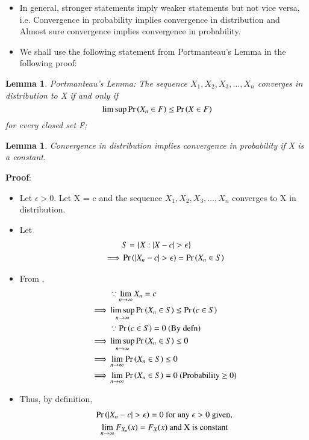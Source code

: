 \documentclass[journal,12pt,twocolumn]{IEEEtran}
\newtheorem{lemma}[theorem]{Lemma}
\begin{document}
\begin{itemize}
    \item In general, stronger statements imply weaker statements but not vice versa, i.e. Convergence in probability implies convergence in distribution and Almost sure convergence implies convergence in probability.
    \item We shall use the following statement from Portmanteau's Lemma in the following proof:
    \end{itemize}
    \begin{lemma}{Portmanteau's Lemma}:\newline
             The sequence $X_1,X_2,X_3, \dots ,X_n$ converges in distribution to X if and only if \begin{equation}
                  \limsup \Pr\left(X_{n}\in F\right) \leq \Pr\left(X \in F\right)
             \end{equation} for every closed set F;
        \end{lemma}

\begin{lemma} Convergence in distribution implies convergence in probability if X is a constant.\end{lemma}
    \textbf{Proof}:
    \begin{itemize}
        \item Let $\epsilon > 0$. Let X = c and the sequence $X_1,X_2,X_3, \dots ,X_n$ converges to X in distribution.
        \item Let \begin{align}
            &S = \{X : |X - c| > \epsilon\} \\
            \implies &\pr{|X_n - c|>\epsilon} = \pr{X_ n\in S}
        \end{align}
        \item From , 
        \begin{align}
           &\because \lim_{n \rightarrow \infty}X_n = c \\
            \implies &\limsup_{n \rightarrow \infty} \Pr\left(X_n \in S\right) \leq  \Pr\left(c \in S\right) \\
            &\because \Pr\left(c \in S\right) = 0 \text{ (By defn)} \\
            \implies &\limsup_{n \rightarrow \infty} \Pr\left(X_n \in S\right) \leq 0 \\
            \implies &\lim_{n \rightarrow \infty} \Pr\left(X_n \in S\right) \leq 0\\
            \implies &\lim_{n \rightarrow \infty} \Pr\left(X_n \in S\right) = 0 \text{ (Probability $\geq 0$)}
        \end{align}
        
        \item Thus, by definition,
        \begin{multline}
             \pr{|X_n-c|> \epsilon} = 0 \text{ for any }\epsilon > 0 \text{ given,} \\    
            \lim_{n \rightarrow \infty} F_{X_n}(x) = F_X(x)\text{ and X is constant}
        \end{multline}
    \end{itemize}
\end{document}
